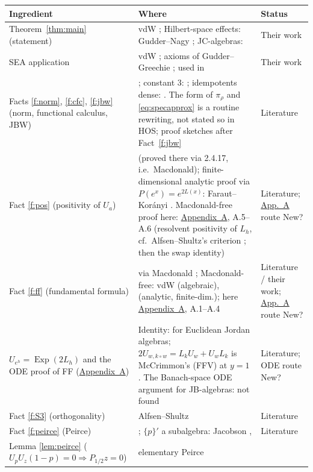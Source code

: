 \documentclass[11pt]{article}
\theoremstyle{remark}
\newcommand{\jp}{\circ}
\newcommand{\Pp}{P_{1/2}}
\DeclareMathOperator{\Exp}{Exp}
\begin{document}
\begin{longtable}{>{\raggedright}p{4.1cm}>{\raggedright}p{7.6cm}>{\raggedright\arraybackslash}p{2.9cm}}
\hline
\textbf{Ingredient} & \textbf{Where} & \textbf{Status}\\\hline\endhead
Theorem~\ref{thm:main} (statement) & vdW \cite[Thms.~3.12, 3.13]{vdW}; Hilbert-space
effects: Gudder--Nagy \cite{GN01}; JC-algebras: \cite[Prop.~3.3]{vdW} & Their work\\
SEA application & vdW \cite[Thm.~4.2, Prop.~4.4]{vdW}; axioms of Gudder--Greechie
\cite{GG02}; used in \cite{WWvdW20,WWvdW21} & Their work\\
Facts \ref{f:norm}, \ref{f:cfc}, \ref{f:jbw} (norm, functional calculus, JBW) &
\cite[\S\S3.1, 3.2, 4.1, 4.2]{HOS}; constant $3$: \cite[3.2.7]{HOS}; idempotents dense:
\cite[4.2.3]{HOS}. The form of $\pi_\rho$ and \eqref{eq:specapprox} is a routine
rewriting, not stated so in HOS; proof sketches after Fact~\ref{f:jbw} & Literature\\
Fact \ref{f:pos} (positivity of $U_a$) & \cite[3.3.6]{HOS} (proved there via 2.4.17,
i.e.\ Macdonald); finite-dimensional analytic proof via $P(e^x) = e^{2L(x)}$:
Faraut--Kor\'anyi \cite[Ch.~II--III, numbers unverified]{FK}. Macdonald-free proof here:
\hyperref[app:mac]{Appendix~A}, A.5--A.6 (resolvent positivity of $L_h$, cf.\ Alfsen--Shultz's
criterion \cite[(1.82), number unverified]{ASss}; then the swap identity) & Literature;
\hyperref[app:mac]{App.~A} route New?\\
Fact \ref{f:ff} (fundamental formula) & \cite[2.4.18]{HOS} via Macdonald \cite{Mac60};
Macdonald-free: vdW \cite{vdWFF} (algebraic), \cite{FK} (analytic, finite-dim.); here
\hyperref[app:mac]{Appendix~A}, A.1--A.4 &
Literature / their work; \hyperref[app:mac]{App.~A} route New?\\
$U_{e^h} = \Exp(2L_h)$ and the ODE proof of FF (\hyperref[app:mac]{Appendix~A}) &
Identity: \cite{FK} for Euclidean Jordan algebras; $2U_{w,k\jp w} = L_kU_w+U_wL_k$ is
McCrimmon's (FFV) at $y=1$ \cite[5.2.3]{McC}. The Banach-space ODE argument for
JB-algebras: not found & Literature; ODE route New?\\
Fact \ref{f:S3} (orthogonality) & Alfsen--Shultz \cite[Lemma~1.26, as quoted in
{\cite[Lemma~4.1]{vdW}}]{AS} & Literature\\
Fact \ref{f:peirce} (Peirce) & \cite[\S2.6]{HOS}; $\{p\}'$ a subalgebra: Jacobson
\cite{Jac89}, \cite[Prop.~2.13]{vdW} & Literature\\
Lemma \ref{lem:peirce} ($U_pU_z(1-p) = 0\Rightarrow\Pp z = 0$) & elementary Peirce

\end{longtable}
\end{document}
